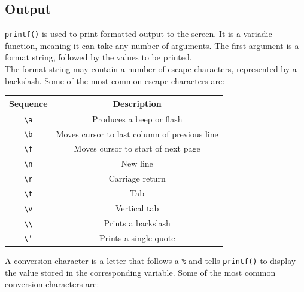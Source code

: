 \documentclass[a4paper, 10pt]{article}
\begin{document}
\subsection{Output}
\texttt{printf()} is used to print formatted output to the screen. It is a variadic function, meaning it can take any number of arguments. The first argument is a format string, followed by the values to be printed.\\[2ex]
The format string may contain a number of escape characters, represented by a backslash. Some of the most common escape characters are:
\begin{center}
    \begin{tabular}{|c|c|}
        \hline
        Sequence                               & Description                                  \\
        \hline
        \texttt{\textbackslash a}              & Produces a beep or flash                     \\
        \hline
        \texttt{\textbackslash b}              & Moves cursor to last column of previous line \\
        \hline
        \texttt{\textbackslash f}              & Moves cursor to start of next page           \\
        \hline
        \texttt{\textbackslash n}              & New line                                     \\
        \hline
        \texttt{\textbackslash r}              & Carriage return                              \\
        \hline
        \texttt{\textbackslash t}              & Tab                                          \\
        \hline
        \texttt{\textbackslash v}              & Vertical tab                                 \\
        \hline
        \texttt{\textbackslash \textbackslash} & Prints a backslash                           \\
        \hline
        \texttt{\textbackslash '}              & Prints a single quote                        \\
        \hline
    \end{tabular}
\end{center}
A conversion character is a letter that follows a \texttt{\%} and tells \texttt{printf()} to display the value stored in the corresponding variable. Some of the most common conversion characters are:
\end{document}
